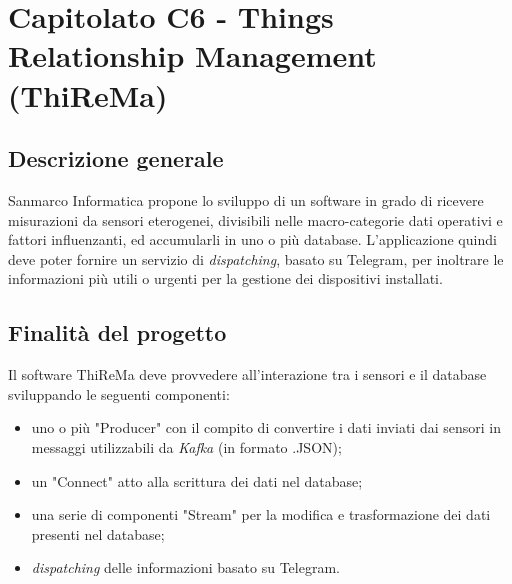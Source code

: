 \section{Capitolato C6 - Things Relationship Management (ThiReMa)}

\subsection{Descrizione generale}
Sanmarco Informatica propone lo sviluppo di un software in grado di ricevere misurazioni da sensori eterogenei, divisibili nelle macro-categorie dati operativi e fattori influenzanti, ed accumularli in uno o più database. L'applicazione quindi deve poter fornire un servizio di \textit{dispatching\glos}, basato su Telegram, per inoltrare le informazioni più utili o urgenti per la gestione dei dispositivi installati.

\subsection{Finalità del progetto}
Il software ThiReMa deve provvedere all'interazione tra i sensori e il database sviluppando le seguenti componenti:
\begin{itemize}
	\item uno o più "Producer" con il compito di convertire i dati inviati dai sensori in messaggi utilizzabili da \textit{Kafka\glo} (in formato .JSON);
	\item un "Connect" atto alla scrittura dei dati nel database;
	\item una serie di componenti "Stream" per la modifica e trasformazione dei dati presenti nel database;
	\item \textit{dispatching\glo} delle informazioni basato su Telegram.
\end{itemize}

